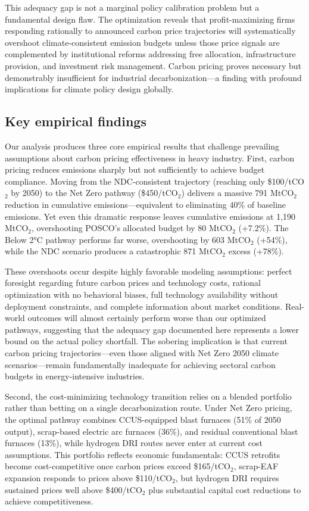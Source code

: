 \documentclass[preprint,1p,authoryear]{elsarticle}
\begin{document}
This adequacy gap is not a marginal policy calibration problem but a fundamental design flaw. The optimization reveals that profit-maximizing firms responding rationally to announced carbon price trajectories will systematically overshoot climate-consistent emission budgets unless those price signals are complemented by institutional reforms addressing free allocation, infrastructure provision, and investment risk management. Carbon pricing proves necessary but demonstrably insufficient for industrial decarbonization—a finding with profound implications for climate policy design globally.

\subsection{Key empirical findings}

Our analysis produces three core empirical results that challenge prevailing assumptions about carbon pricing effectiveness in heavy industry. First, carbon pricing reduces emissions sharply but not sufficiently to achieve budget compliance. Moving from the NDC-consistent trajectory (reaching only \$100/tCO$_2$ by 2050) to the Net Zero pathway (\$450/tCO$_2$) delivers a massive 791 MtCO$_2$ reduction in cumulative emissions—equivalent to eliminating 40\% of baseline emissions. Yet even this dramatic response leaves cumulative emissions at 1,190 MtCO$_2$, overshooting POSCO's allocated budget by 80 MtCO$_2$ (+7.2\%). The Below 2°C pathway performs far worse, overshooting by 603 MtCO$_2$ (+54\%), while the NDC scenario produces a catastrophic 871 MtCO$_2$ excess (+78\%).

These overshoots occur despite highly favorable modeling assumptions: perfect foresight regarding future carbon prices and technology costs, rational optimization with no behavioral biases, full technology availability without deployment constraints, and complete information about market conditions. Real-world outcomes will almost certainly perform worse than our optimized pathways, suggesting that the adequacy gap documented here represents a lower bound on the actual policy shortfall. The sobering implication is that current carbon pricing trajectories—even those aligned with Net Zero 2050 climate scenarios—remain fundamentally inadequate for achieving sectoral carbon budgets in energy-intensive industries.

Second, the cost-minimizing technology transition relies on a blended portfolio rather than betting on a single decarbonization route. Under Net Zero pricing, the optimal pathway combines CCUS-equipped blast furnaces (51\% of 2050 output), scrap-based electric arc furnaces (36\%), and residual conventional blast furnaces (13\%), while hydrogen DRI routes never enter at current cost assumptions. This portfolio reflects economic fundamentals: CCUS retrofits become cost-competitive once carbon prices exceed \$165/tCO$_2$, scrap-EAF expansion responds to prices above \$110/tCO$_2$, but hydrogen DRI requires sustained prices well above \$400/tCO$_2$ plus substantial capital cost reductions to achieve competitiveness.
\end{document}
